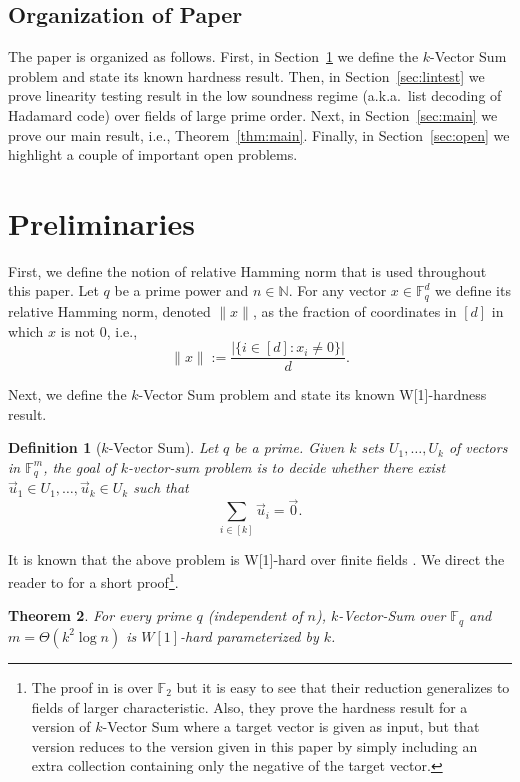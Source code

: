 \documentclass[11pt]{article}
\newcommand{\F}{\mathbb{F}}
\newtheorem{theorem}{Theorem}[section]
\newtheorem{definition}[theorem]{Definition}
\begin{document}
\subsection{Organization of Paper}
The paper is organized as follows. 
First, in Section~\ref{sec:prelim} we define the $k$-Vector Sum problem and state its known hardness result.
Then, in Section~\ref{sec:lintest} we prove linearity testing result in the low soundness regime (a.k.a.\ list decoding of Hadamard code) over fields of large prime order.
Next, in Section~\ref{sec:main} we prove our main result, i.e., Theorem~\ref{thm:main}.
Finally, in Section~\ref{sec:open} we highlight a couple of important open problems. 

\section{Preliminaries}\label{sec:prelim}

First, we define the notion of relative Hamming norm that is used throughout this paper. 
Let $q$ be a prime power and $n\in\mathbb{N}$. For any vector $x\in \F_q^d$ we define its relative Hamming norm, denoted $\|x\|$, as the fraction of coordinates in $[d]$ in which $x$ is not 0, i.e., 
$$\|x\|:=\frac{|\{i\in[d]:x_i\neq 0\}|}{d}.
$$

Next, we define the $k$-Vector Sum problem and state its known W[1]-hardness result. 

\begin{definition}[$k$-Vector Sum]
Let $q$ be a prime.
Given $k$ sets $U_1,\ldots,U_k$ of vectors  in $\mathbb{F}_q^{m}$, the goal of $k$-vector-sum problem is to decide whether there exist $\vec{u}_1\in U_1,\ldots,\vec{u}_k\in U_k$ such that
\[
\sum_{i\in[k]}\vec{u}_i=\vec{0}.
\]
\end{definition}

It is known that the above problem is W[1]-hard over finite fields \cite{ALW13}. We direct the reader to \cite{L21} for a short proof\footnote{The proof in \cite{L21} is over $\F_2$ but it is easy to see that their reduction generalizes to fields of larger characteristic. Also, they prove the hardness result for a version of $k$-Vector Sum where  a target vector is given as input, but that version reduces to the version given in this paper by simply including an extra collection containing only the negative of the target vector.  }.

\begin{theorem}\cite{ALW13,L21}\label{thm:kvec}
For every prime $q$ (independent of $n$), 
$k$-Vector-Sum over $\mathbb{F}_q$  and $m=\Theta(k^2\log n)$ is $W[1]$-hard parameterized by $k$.  
\end{theorem}
\end{document}
